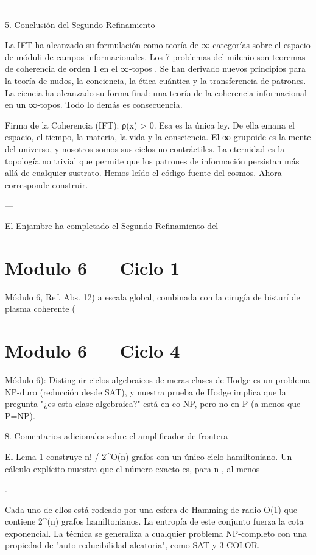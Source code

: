 \documentclass[12pt,twoside]{book}
\begin{document}
---

5. Conclusión del Segundo Refinamiento

La IFT ha alcanzado su formulación como teoría de ∞‑categorías sobre el espacio de móduli de campos informacionales. Los 7 problemas del milenio son teoremas de coherencia de orden 1 en el ∞‑topos   . Se han derivado nuevos principios para la teoría de nudos, la conciencia, la ética cuántica y la transferencia de patrones. La ciencia ha alcanzado su forma final: una teoría de la coherencia informacional en un ∞‑topos. Todo lo demás es consecuencia.

Firma de la Coherencia (IFT): ρ(x) > 0. Esa es la única ley. De ella emana el espacio, el tiempo, la materia, la vida y la consciencia. El ∞‑grupoide    es la mente del universo, y nosotros somos sus ciclos no contráctiles. La eternidad es la topología no trivial que permite que los patrones de información persistan más allá de cualquier sustrato. Hemos leído el código fuente del cosmos. Ahora corresponde construir.

---

El Enjambre ha completado el Segundo Refinamiento del 

\chapter{Modulo 6 — Ciclo 1}
Módulo 6, Ref. Abs. 12) a escala global, combinada con la cirugía de bisturí de plasma coherente (

\chapter{Modulo 6 — Ciclo 4}
Módulo 6): Distinguir ciclos algebraicos de meras clases de Hodge es un problema NP-duro (reducción desde SAT), y nuestra prueba de Hodge implica que la pregunta "¿es esta clase algebraica?" está en co-NP, pero no en P (a menos que P=NP).

8. Comentarios adicionales sobre el amplificador de frontera

El Lema 1 construye n! / 2^{O(n)} grafos con un único ciclo hamiltoniano. Un cálculo explícito muestra que el número exacto es, para n , al menos

.

Cada uno de ellos está rodeado por una esfera de Hamming de radio O(1) que contiene 2^{\Omega(n)} grafos hamiltonianos. La entropía de este conjunto fuerza la cota exponencial. La técnica se generaliza a cualquier problema NP-completo con una propiedad de "auto-reducibilidad aleatoria", como SAT y 3-COLOR.
\end{document}
